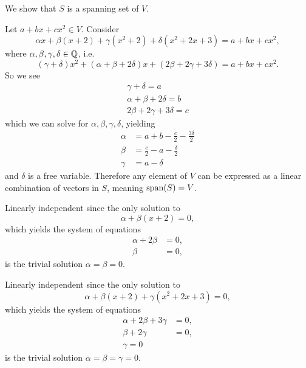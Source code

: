 \begin{questions}
    \item We show that $S$ is a spanning set of $V$.

    Let $a + bx + cx^2 \in V$. Consider
    \[
        \alpha x + \beta(x + 2) + \gamma(x^2 + 2) + \delta(x^2 + 2x + 3) = a + bx + cx^2,
    \]
    where $\alpha, \beta, \gamma, \delta \in \mathbb{Q}$, i.e.
    \[
        (\gamma + \delta)x^2 + (\alpha + \beta + 2\delta)x + (2\beta + 2\gamma + 3\delta) = a + bx + cx^2.
    \]
    So we see
    \begin{align*}
        \gamma + \delta = a\\
        \alpha + \beta + 2\delta = b\\
        2\beta + 2\gamma + 3\delta = c
    \end{align*}
    which we can solve for $\alpha, \beta, \gamma, \delta$, yielding
    \begin{align*}
        \alpha &= a + b - \frac{c}{2} - \frac{3\delta}{2}\\
        \beta &= \frac{c}{2} - a - \frac{\delta}{2}\\
        \gamma &= a - \delta
    \end{align*}
    and $\delta$ is a free variable. Therefore any element of $V$ can be expressed as a linear combination of vectors in $S$, meaning $\mathrm{span}(S) = V$.

    \item \begin{partquestions}{\alph*}
        \item Linearly independent since the only solution to
        \[
            \alpha + \beta(x+2) = 0,
        \]
        which yields the system of equations
        \begin{align*}
            \alpha + 2\beta &= 0,\\
            \beta &= 0,
        \end{align*}
        is the trivial solution $\alpha = \beta = 0$.

        \item Linearly independent since the only solution to
        \[
            \alpha + \beta(x+2) + \gamma(x^2 + 2x + 3) = 0,
        \]
        which yields the system of equations
        \begin{align*}
            \alpha + 2\beta + 3\gamma &= 0,\\
            \beta + 2\gamma &= 0,\\
            \gamma = 0
        \end{align*}
        is the trivial solution $\alpha = \beta = \gamma = 0$.


\end{partquestions}
\end{questions}
